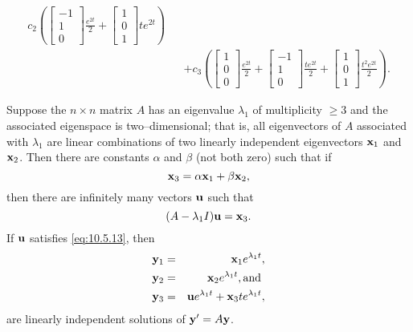 \documentclass{ximera}
\begin{document}
\begin{example}
\begin{explanation}
\begin{eqnarray*}
c_2\left(\begin{bmatrix}-1\\1\\0\end{bmatrix}\frac{e^{2t}}{2}+\begin{bmatrix}1\\0\\1\end{bmatrix}te^{2t}\right)\\
&&+c_3\left(\begin{bmatrix}1\\0\\0\end{bmatrix}\frac{e^{2t}}{2}+
\begin{bmatrix}-1\\1\\0\end{bmatrix}\frac{te^{2t}}{2}+\begin{bmatrix}1\\0\\1\end{bmatrix}\frac{t^2e^{2t}}{2}\right).
\end{eqnarray*}
\end{explanation}
\end{example}

\begin{theorem}\label{thmtype:10.5.3}
Suppose the $n\times n$ matrix $A$ has an eigenvalue $\lambda_1$ of
multiplicity $\geq 3$ and the associated eigenspace is
two--dimensional; that is, all eigenvectors of $A$ associated with
$\lambda_1$ are linear combinations of two linearly independent
eigenvectors ${\bf x}_1$ and ${\bf x}_2$. Then there are constants
$\alpha$ and $\beta$ (not both zero) such that if
\begin{equation}\label{eq:10.5.12}
{\bf x}_3=\alpha{\bf x}_1+\beta{\bf x}_2,
\end{equation}
then there are infinitely many vectors ${\bf u}$ such that
\begin{equation}\label{eq:10.5.13}
(A-\lambda_1I){\bf u}={\bf x}_3.
\end{equation}
If ${\bf u}$ satisfies  \eqref{eq:10.5.13}, then
\begin{eqnarray}
{\bf y}_1&=&{\bf x}_1 e^{\lambda_1t},\nonumber\\
{\bf y}_2&=&{\bf x}_2e^{\lambda_1t},\mbox{and }\nonumber\\
{\bf y}_3&=&{\bf u}e^{\lambda_1t}+{\bf x}_3te^{\lambda_1t}\label{eq:10.5.14},
\end{eqnarray}
are linearly independent solutions of  ${\bf y}'=A{\bf y}$.
\end{theorem}
\end{document}
